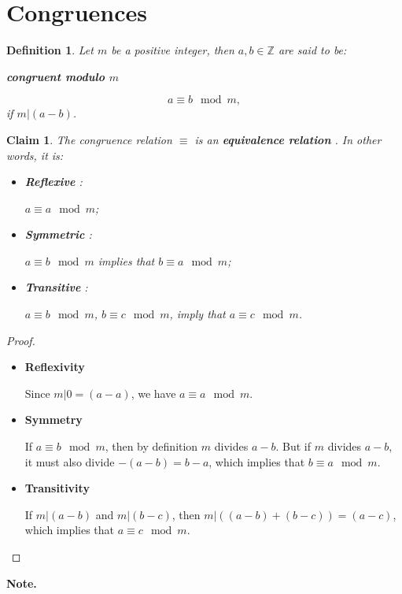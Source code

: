 \documentclass[a4paper,12pt]{report}
\newcounter{statement}
\numberwithin{statement}{chapter}
\newtheorem{defn}[statement]{Definition}
\newtheorem{claim}[statement]{Claim}
\numberwithin{equation}{chapter}
\numberwithin{section}{chapter}
\numberwithin{subsection}{section}
\begin{document}
\section{Congruences}

\begin{defn}
Let $m$ be a positive integer, then $a, b \in \mathbb{Z}$ are said to be:

 {\bf congruent modulo $m$} 

\[
a \equiv b \mod m,
\]
if $m | (a - b)$.
\end{defn}
\begin{claim}

The congruence relation $\equiv$ is an  {\bf  equivalence relation} . In other words, it
is:

\begin{itemize}
\item 
 {\bf Reflexive} :


$a \equiv a \mod m$;

\item   {\bf Symmetric} :


$a \equiv b \mod m$ implies that $b \equiv a \mod m$;

\item   {\bf Transitive} :


$a \equiv b \mod m$, $b \equiv c \mod m$, imply that $a \equiv c \mod m$.
\end{itemize}

\end{claim}
\begin{proof}

\begin{itemize}
\item 
 {\bf Reflexivity} 

Since $m | 0 = (a - a)$, we have $a\equiv a \mod m$.


\item 
 {\bf Symmetry} 

If $a \equiv b \mod m$, then by definition $m$ divides $a - b$.
But if $m$ divides $a - b$,
it must also divide $-(a - b) = b - a$, which implies that $b \equiv a \mod m$.


\item 
 {\bf Transitivity} 

If $m | (a - b)$ and $m | (b - c)$, then $m | ((a - b) + (b - c)) = (a - c)$, which implies
that $a \equiv c \mod m$.

\end{itemize}


\end{proof}
 {\bf Note.} 
\end{document}
